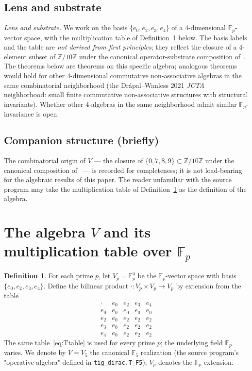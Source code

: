 \documentclass[11pt,reqno]{amsart}
\theoremstyle{plain}
\theoremstyle{definition}
\newtheorem{definition}[theorem]{Definition}
\theoremstyle{remark}
\newcommand{\Z}{\mathbb{Z}}
\newcommand{\F}{\mathbb{F}}
\begin{document}
\subsection{Lens and substrate}
\label{subsec:lens}

\emph{Lens and substrate.} We work on the basis $\{e_0, e_2, e_3, e_4\}$
of a 4-dimensional $\F_p$-vector space, with the multiplication table
of Definition~\ref{def:T} below. The basis labels and the table are
\emph{not derived from first principles}; they reflect the closure of a
4-element subset of $\Z/10\Z$ under the canonical operator-substrate
composition of~\cite{SandersGishFourCore}. The theorems below are
theorems on this specific algebra; analogous theorems would hold for
other 4-dimensional commutative non-associative algebras in the same
combinatorial neighborhood (the Drápal--Wanless 2021 \emph{JCTA}
neighborhood: small finite commutative non-associative structures with
structural invariants). Whether other 4-algebras in the same
neighborhood admit similar $\F_p$-invariance is open.

\subsection{Companion structure (briefly)}
\label{subsec:origin}

The combinatorial origin of $V$ — the closure of $\{0, 7, 8, 9\} \subset \Z/10\Z$
under the canonical composition of~\cite{SandersGishFourCore} — is
recorded for completeness; it is not load-bearing for the algebraic
results of this paper. The reader unfamiliar with the source program
may take the multiplication table of Definition~\ref{def:T} as the
definition of the algebra.

\section{The algebra $V$ and its multiplication table over $\F_p$}

\begin{definition}\label{def:T}
For each prime $p$, let $V_p = \F_p^4$ be the $\F_p$-vector space with
basis $\{e_0, e_2, e_3, e_4\}$. Define the bilinear product
$\cdot: V_p \times V_p \to V_p$ by extension from the table
\begin{equation}
\label{eq:Ttable}
\begin{array}{c|cccc}
\cdot & e_0 & e_2 & e_3 & e_4 \\ \hline
e_0 & e_0 & e_0 & e_0 & e_0 \\
e_2 & e_0 & e_2 & e_2 & e_2 \\
e_3 & e_0 & e_2 & e_2 & e_2 \\
e_4 & e_0 & e_2 & e_2 & e_2
\end{array}
\end{equation}
The same table~\eqref{eq:Ttable} is used for every prime $p$; the
underlying field $\F_p$ varies. We denote by $V = V_5$ the canonical
$\F_5$ realization (the source program's "operative algebra" defined
in \texttt{tig\_dirac.T\_F5}); $V_p$ denotes the $\F_p$ extension.
\end{definition}
\end{document}

